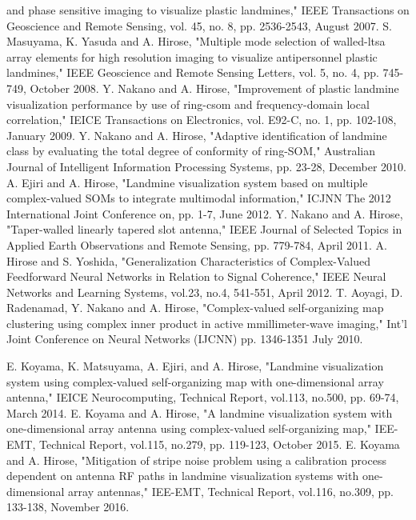 ﻿\documentclass[12pt,oneside]{jsbook}
\begin{document}
\begin{thebibliography}{99}
and phase sensitive imaging to visualize plastic landmines," IEEE Transactions
on Geoscience and Remote Sensing, vol. 45, no. 8, pp. 2536-2543, August 2007.
 S. Masuyama, K. Yasuda and A. Hirose, "Multiple mode selection of
walled-ltsa array elements for high resolution imaging to visualize antipersonnel
plastic landmines," IEEE Geoscience and Remote Sensing Letters, vol. 5,
        no. 4, pp. 745-749, October 2008.
 Y. Nakano and A. Hirose, "Improvement of plastic
        landmine visualization performance by use of ring-csom and
        frequency-domain local correlation," IEICE Transactions on
        Electronics, vol. E92-C, no. 1, pp. 102-108, January 2009.
 Y. Nakano and A. Hirose, "Adaptive identification of
        landmine class by evaluating the total degree of conformity of
        ring-SOM," Australian Journal of Intelligent Information
        Processing Systems, pp. 23-28, December 2010.
 A. Ejiri and A. Hirose, "Landmine visualization
        system based on multiple complex-valued SOMs to integrate
        multimodal information," ICJNN The 2012 International Joint
        Conference on, pp. 1-7, June 2012.
 Y. Nakano and A. Hirose, "Taper-walled linearly
        tapered slot antenna," IEEE Journal of Selected Topics in
        Applied Earth Observations and Remote Sensing, pp. 779-784, 
        April 2011.
 A. Hirose and S. Yoshida, "Generalization
        Characteristics of Complex-Valued Feedforward Neural Networks in
        Relation to Signal Coherence," IEEE Neural Networks and Learning
        Systems, vol.23, no.4, 541-551, April 2012.
 T. Aoyagi, D. Radenamad, Y. Nakano and A. Hirose,
        "Complex-valued self-organizing map clustering using complex
        inner product in active mmillimeter-wave imaging," Int'l Joint
        Conference on Neural Networks (IJCNN) pp. 1346-1351 July 2010.
\end{thebibliography}
\renewcommand{\bibname}{発表文献}
\begin{thebibliography}{9}
 E. Koyama, K. Matsuyama, A. Ejiri, and
        A. Hirose, "Landmine visualization system using complex-valued
        self-organizing map with one-dimensional array antenna," IEICE
        Neurocomputing, Technical Report, vol.113, no.500, 
        pp. 69-74, March 2014.
E. Koyama and A. Hirose, "A landmine visualization system
with one-dimensional array antenna using complex-valued self-organizing map,"
 IEE-EMT, Technical Report, vol.115, no.279, pp. 119-123, October 2015.
E. Koyama and A. Hirose, "Mitigation of stripe noise problem
 using a calibration process dependent on antenna RF paths in landmine
visualization systems with one-dimensional array antennas," IEE-EMT,
Technical Report, vol.116, no.309, pp. 133-138, November 2016.
\end{thebibliography}
\end{document}
